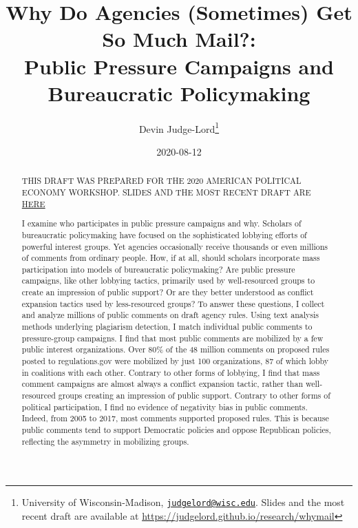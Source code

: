 \documentclass[
      12pt,
        ]{article}
\title{Why Do Agencies (Sometimes) Get So Much Mail?: 
           \\ Public Pressure Campaigns and Bureaucratic Policymaking}
\author{ %
            Devin Judge-Lord\footnote{University of Wisconsin-Madison, \href{mailto:judgelord@wisc.edu}{\nolinkurl{judgelord@wisc.edu}}. Slides and the most recent draft are available at \url{https://judgelord.github.io/research/whymail}} 
            }
\date{2020-08-12}
\begin{document}
 


  \maketitle




  \begin{abstract}
    \noindent THIS DRAFT WAS PREPARED FOR THE 2020 AMERICAN POLITICAL ECONOMY WORKSHOP. SLIDES AND THE MOST RECENT DRAFT ARE \href{https://judgelord.github.io/research/whymail/}{HERE}

\bigskip

I examine who participates in public pressure campaigns and why. Scholars of bureaucratic policymaking have focused on the sophisticated lobbying efforts of powerful interest groups. Yet agencies occasionally receive thousands or even millions of comments from ordinary people. How, if at all, should scholars incorporate mass participation into models of bureaucratic policymaking? Are public pressure campaigns, like other lobbying tactics, primarily used by well-resourced groups to create an impression of public support? Or are they better understood as conflict expansion tactics used by less-resourced groups? To answer these questions, I collect and analyze millions of public comments on draft agency rules. Using text analysis methods underlying plagiarism detection, I match individual public comments to pressure-group campaigns. I find that most public comments are mobilized by a few public interest organizations. Over 80\% of the 48 million comments on proposed rules posted to regulations.gov were mobilized by just 100 organizations, 87 of which lobby in coalitions with each other. Contrary to other forms of lobbying, I find that mass comment campaigns are almost always a conflict expansion tactic, rather than well-resourced groups creating an impression of public support. Contrary to other forms of political participation, I find no evidence of negativity bias in public comments. Indeed, from 2005 to 2017, most comments supported proposed rules. This is because public comments tend to support Democratic policies and oppose Republican policies, reflecting the asymmetry in mobilizing groups. 

    

  \end{abstract}
\end{document}
